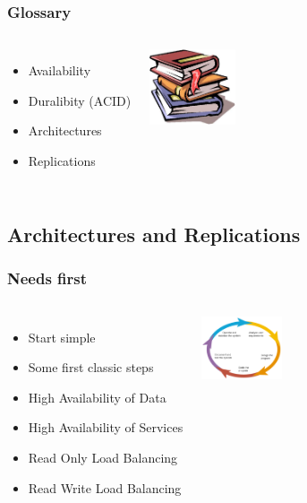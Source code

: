 \documentclass[english]{beamer}
\begin{document}
\begin{frame}
  \frametitle{Glossary}
  
  \linebreak
  \linebreak

\begin{columns}[c]

  \begin{itemize}
    \item<3,4,6> Availability 
    \item<2,6> Duralibity (ACI\alert{D})
    \item<5,6> Architectures
    \item<1,6> Replications
  \end{itemize}  

\includegraphics[height=6em]{glossaire.jpg}
\end{columns}
\end{frame}

\subsection{Architectures and Replications}

\begin{frame}[fragile]
  \frametitle{Needs first}

  \linebreak

\begin{columns}[c]

\begin{itemize}
  \item<1-> Start simple
  \item<1-> Some first classic steps
  \item<2-> High Availability of Data
  \item<2-> High Availability of Services
  \item<3-> Read Only Load Balancing
  \item<3-> Read Write Load Balancing
\end{itemize}

\includegraphics[height=5em]{development_life_cycle.png}
\end{columns}
\end{frame}
\end{document}
